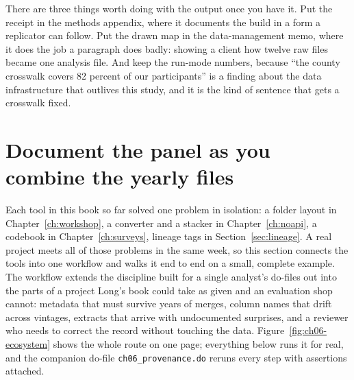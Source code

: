 \documentclass[
    a4paper,
    fontsize=10pt,
    twoside=true,
    numbers=noenddot,
]{kaobook}
\begin{document}
There are three things worth doing with the output once you have it. Put the receipt in the methods appendix, where it documents the build in a form a replicator can follow. Put the drawn map in the data-management memo, where it does the job a paragraph does badly: showing a client how twelve raw files became one analysis file. And keep the run-mode numbers, because \enquote{the county crosswalk covers 82 percent of our participants} is a finding about the data infrastructure that outlives this study, and it is the kind of sentence that gets a crosswalk fixed.

\section{Document the panel as you combine the yearly files}\label{sec:ch06-ecosystem}
Each tool in this book so far solved one problem in isolation: a folder layout in Chapter~\ref{ch:workshop}, a converter and a stacker in Chapter~\ref{ch:noapi}, a codebook in Chapter~\ref{ch:surveys}, lineage tags in Section~\ref{sec:lineage}. A real project meets all of those problems in the same week, so this section connects the tools into one workflow and walks it end to end on a small, complete example. The workflow extends the discipline \textcite{long2009workflow} built for a single analyst's do-files out into the parts of a project Long's book could take as given and an evaluation shop cannot: metadata that must survive years of merges, column names that drift across vintages, extracts that arrive with undocumented surprises, and a reviewer who needs to correct the record without touching the data. Figure~\ref{fig:ch06-ecosystem} shows the whole route on one page; everything below runs it for real, and the companion do-file \texttt{ch06\_provenance.do} reruns every step with assertions attached.
\end{document}

